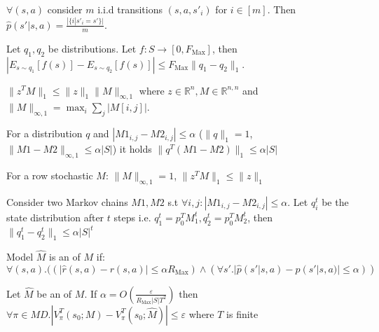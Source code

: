  $\forall(s, a)$ consider $m$ i.i.d transitions $(s, a, s'_i)$ for $i \in [m]$. Then $\hat{p}(s' |s, a) = \frac{|\{i|s'_i = s'\}|}{m}$.
\begin{thm}
Let $q_1, q_2$ be distributions. Let $f: S \rightarrow [0, F_{\text{Max}}]$, then $|E_{s\sim q_1}[f(s)] - E_{s\sim q_2}[f(s)]| \leq F_{\text{Max}}\|q_1 - q_2\|_1$.
\end{thm}
\begin{clm}
$\|z^TM\|_1 \leq \|z\|_1\|M\|_{\infty,1}$ where $z \in \mathbb{R}^n, M \in \mathbb{R}^{n,n}$ and $\|M\|_{\infty,1} = \max_i \sum_j |M[i,j]|$.
\end{clm}

\begin{cor} For a distribution $q$ and $|M1_{i,j} - M2_{i,j}| \leq \alpha$ ($\|q\|_1 = 1$, $\|M1 - M2\|_{\infty,1} \leq \alpha|S|$) it holds $\|q^T(M1 - M2)\|_1 \leq \alpha|S|$\end{cor}
\begin{cor}For a row stochastic $M$: $\|M\|_{\infty,1} = 1$, $\|z^TM\|_1 \leq \|z\|_1$\end{cor}
\begin{thm}Consider two Markov chains $M1, M2$ s.t $\forall i,j: |M1_{i,j} - M2_{i,j}| \leq \alpha$. Let $q^t_i$ be the state distribution after $t$ steps i.e. $q^t_1 = p_0^TM^t_1, q^t_2 = p_0^TM^t_2$, then $\|q^t_1 - q^t_2\|_1 \leq \alpha|S|^t$\end{thm}


\begin{deff} Model $\hat{M}$ is an  of $M$ if: $\forall (s, a). ((|\hat{r}(s, a) - r(s, a)| \leq \alpha R_{\text{Max}}) \land (\forall s'. |\hat{p}(s'|s, a) - p(s'|s, a)| \leq \alpha))$\end{deff}

\begin{thm} Let $\hat{M}$ be an of $M$. If $\alpha = O\left( \frac{\varepsilon}{R_{\text{Max}}|S|T^2} \right)$ then $\forall \pi \in MD. |V^T_{\pi}(s_0 ; M) - V^T_{\pi}(s_0 ; \hat{M})| \leq \varepsilon$ where $T$ is finite\end{thm}


